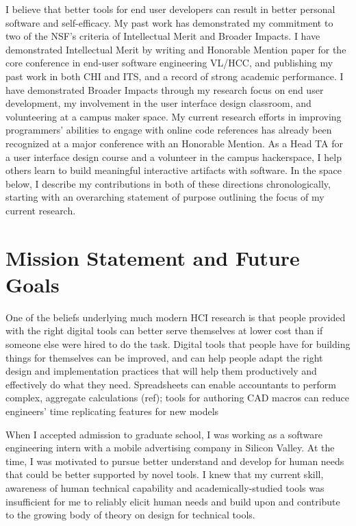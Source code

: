 \documentclass[12pt]{memoir}
\title{}
\author{Andrew Head}
\begin{document}


I believe that better tools for end user developers can result in better personal software and self-efficacy.
My past work has demonstrated my commitment to two of the NSF's criteria of Intellectual Merit and Broader Impacts.
I have demonstrated Intellectual Merit by writing and Honorable Mention paper for the core conference in end-user software engineering VL/HCC, and publishing my past work in both CHI and ITS, and a record of strong academic performance.
I have demonstrated Broader Impacts through my research focus on end user development, my involvement in the user interface design classroom, and volunteering at a campus maker space.
\fi
My current research efforts in improving programmers' abilities to engage with online code references has already been recognized at a major conference with an Honorable Mention.
As a Head TA for a user interface design course and a volunteer in the campus hackerspace, I help others learn to build meaningful interactive artifacts with software.
In the space below, I describe my contributions in both of these directions chronologically, starting with an overarching statement of purpose outlining the focus of my current research.

\section{Mission Statement and Future Goals}

One of the beliefs underlying much modern HCI research is that people provided with the right digital tools can better serve themselves at lower cost than if someone else were hired to do the task.
Digital tools that people have for building things for themselves can be improved, and can help people adapt the right design and implementation practices that will help them productively and effectively do what they need.
Spreadsheets can enable accountants to perform complex, aggregate calculations (ref); tools for authoring CAD macros can reduce engineers' time replicating features for new models

When I accepted admission to graduate school, I was working as a software engineering intern with a mobile advertising company in Silicon Valley.
At the time, I was motivated to pursue better understand and develop for human needs that could be better supported by novel tools.
I knew that my current skill, awareness of human technical capability and academically-studied tools was insufficient for me to reliably elicit human needs and build upon and contribute to the growing body of theory on design for technical tools.
\end{document}
